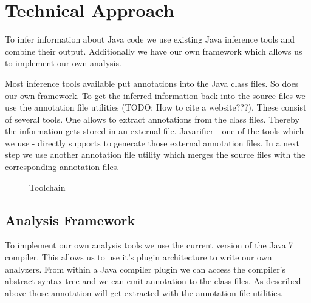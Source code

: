 \section{Technical Approach}
To infer information about Java code we use existing Java inference tools and 
combine their output. Additionally we have our own framework which allows us to
implement our own analysis. 

Most inference tools available put annotations into 
the Java class files. So does our own framework. To get the inferred information
back into the source files we use the annotation file utilities \cite{AFU} 
(TODO: How to cite a website???). 
These consist of several tools. One allows to extract annotations
from the class files. Thereby the information gets stored in an external file.
Javarifier - one of the tools which we use - directly supports to generate those
external annotation files. In a next step we use another annotation file utility which
merges the source files with the corresponding annotation files.

\begin{figure}
\centering
{}
\caption{Toolchain}
\end{figure}

\subsection{Analysis Framework}

To implement our own analysis tools we use the current version of the Java 7 compiler.
This allows us to use it's plugin architecture to write our own analyzers. From within
a Java compiler plugin we can access the compiler's abstract syntax tree and we can emit 
annotation to the class files. As described above those annotation will get extracted 
with the annotation file utilities.
